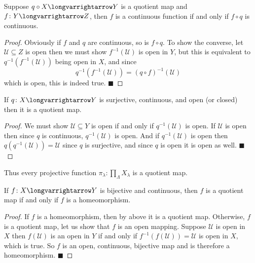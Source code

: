 \documentclass[10pt]{article}
\def\qed{\hskip1cm\penalty-100\hbox{}\hfill$\blacksquare$}
\def\mU{\mathcal{U}}
\def\longto{\longvarrightarrow}
\begin{document}
\begin{prop*}

    Suppose $q\circ X\longto Y$ is a quotient map and $f\colon Y\longto Z$, then $f$ is a continuous function if and only if $f\circ q$ is continuous.

\end{prop*}

\begin{proof}

    Obviously if $f$ and $q$ are continuous, so is $f\circ q$.
    To show the converse, let $\mU\subseteq Z$ is open then we must show $f^{-1}(\mU)$ is open in $Y$, but this is equivalent to $q^{-1}(f^{-1}(\mU))$ being open in $X$, and since
    \[ q^{-1}(f^{-1}(\mU)) = (q\circ f)^{-1}(\mU) \]
    which is open, this is indeed true.
    \qed

\end{proof}

\begin{prop*}

    If $q\colon X\longto Y$ is surjective, continuous, and open (or closed) then it is a quotient map.

\end{prop*}

\begin{proof}

    We must show $\mU\subseteq Y$ is open if and only if $q^{-1}(\mU)$ is open.
    If $\mU$ is open then since $q$ is continuous, $q^{-1}(\mU)$ is open.
    And if $q^{-1}(\mU)$ is open then $q(q^{-1}(\mU))=\mU$ since $q$ is surjective, and since $q$ is open it is open as well.
    \qed

\end{proof}

Thus every projective function $\pi_\lambda\colon\prod_\Lambda X_\lambda$ is a quotient map.

\begin{prop*}

    If $f\colon X\longto Y$ is bijective and continuous, then $f$ is a quotient map if and only if $f$ is a homeomorphism.

\end{prop*}

\begin{proof}

    If $f$ is a homeomorphism, then by above it is a quotient map.
    Otherwise, $f$ is a quotient map, let us show that $f$ is an open mapping.
    Suppose $\mU$ is open in $X$ then $f(\mU)$ is an open in $Y$ if and only if $f^{-1}(f(\mU))=\mU$ is open in $X$, which is true.
    So $f$ is an open, continuous, bijective map and is therefore a homeomorphism.
    \qed

\end{proof}
\end{document}
